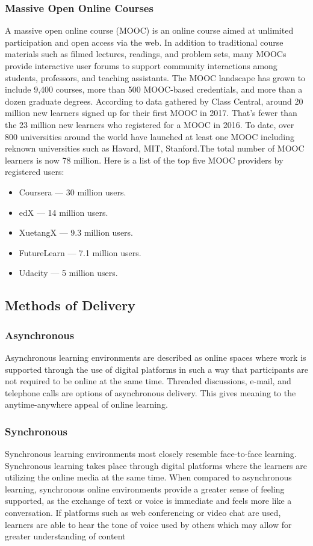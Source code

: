 \documentclass[12pt]{article}
\begin{document}
		\subsubsection{Massive Open Online Courses}
		A massive open online course (MOOC) is an online course aimed at unlimited participation and open access via the web\cite{mooc}. In addition to traditional course materials such as filmed lectures, readings, and problem sets, many MOOCs provide interactive user forums to support community interactions among students, professors, and teaching assistants. The MOOC landscape has grown to include 9,400 courses, more than 500 MOOC-based credentials, and more than a dozen graduate degrees\cite{ccentral}. According to data gathered by Class Central, around 20 million new learners signed up for their first MOOC in 2017. That’s fewer than the 23 million new learners who registered for a MOOC in 2016. To date, over 800 universities around the world have launched at least one MOOC including reknown universities such as Havard\cite{havard}, MIT\cite{mit}, Stanford\cite{stanford}.The total number of MOOC learners is now 78 million. Here is a list of the top five MOOC providers by registered users\cite{ccentral}:
			\begin{itemize}
			
				\item Coursera — 30 million users.
				\item edX — 14 million users.
				\item XuetangX — 9.3 million users.
				\item FutureLearn — 7.1 million users.
				\item Udacity — 5 million users.
			
			\end{itemize}
	\subsection{Methods of Delivery}
		\subsubsection{Asynchronous}
		Asynchronous learning environments are described as online spaces where work is supported through the use of digital platforms in such a way that participants are not required to be online at the same time.\cite{async} Threaded discussions, e-mail, and telephone calls are options of asynchronous delivery.  This gives meaning to the anytime-anywhere appeal of online learning.
		\subsubsection{Synchronous}
		Synchronous learning environments most closely resemble face-to-face learning.  Synchronous learning takes place through digital platforms where the learners are utilizing the online media at the same time.  When compared to asynchronous learning, synchronous online environments provide a greater sense of feeling supported, as the exchange of text or voice is immediate and feels more like a conversation.  If platforms such as web conferencing or video chat are used, learners are able to hear the tone of voice used by others which may allow for greater understanding of content
\end{document}
